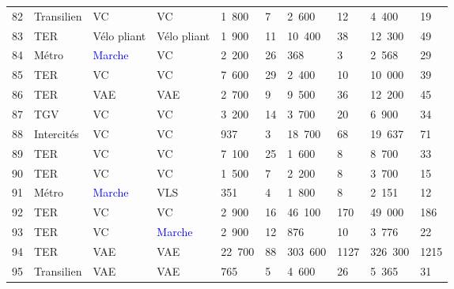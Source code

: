 \begin{longtable}{p{0.7cm}p{1.4cm}p{1.4cm}p{1.6cm}p{0.8cm}p{0.8cm}p{0.8cm}p{0.8cm}p{1.1cm}p{1.1cm}}
    \small{82} & \small{Transilien} & \small{VC} & \small{VC} & \small{1~800} & \small{7} & \small{2~600} & \small{12} & \small{4~400} & \small{19} \\
    \small{83} & \small{TER} & \small{Vélo pliant} & \small{Vélo pliant} & \small{1~900} & \small{11} & \small{10~400} & \small{38} & \small{12~300} & \small{49} \\
    \small{84} & \small{Métro} & \small{\textcolor{blue}{Marche}} & \small{VC} & \small{2~200} & \small{26} & \small{368} & \small{3} & \small{2~568} & \small{29} \\
    \small{85} & \small{TER} & \small{VC} & \small{VC} & \small{7~600} & \small{29} & \small{2~400} & \small{10} & \small{10~000} & \small{39} \\
    \small{86} & \small{TER} & \small{VAE} & \small{VAE} & \small{2~700} & \small{9} & \small{9~500} & \small{36} & \small{12~200} & \small{45} \\
    \small{87} & \small{TGV} & \small{VC} & \small{VC} & \small{3~200} & \small{14} & \small{3~700} & \small{20} & \small{6~900} & \small{34} \\
    \small{88} & \small{Intercités} & \small{VC} & \small{VC} & \small{937} & \small{3} & \small{18~700} & \small{68} & \small{19~637} & \small{71} \\
    \small{89} & \small{TER} & \small{VC} & \small{VC} & \small{7~100} & \small{25} & \small{1~600} & \small{8} & \small{8~700} & \small{33} \\
    \small{90} & \small{TER} & \small{VC} & \small{VC} & \small{1~500} & \small{7} & \small{2~200} & \small{8} & \small{3~700} & \small{15} \\
    \small{91} & \small{Métro} & \small{\textcolor{blue}{Marche}} & \small{VLS} & \small{351} & \small{4} & \small{1~800} & \small{8} & \small{2~151} & \small{12} \\
    \small{92} & \small{TER} & \small{VC} & \small{VC} & \small{2~900} & \small{16} & \small{46~100} & \small{170} & \small{49~000} & \small{186} \\
    \small{93} & \small{TER} & \small{VC} & \small{\textcolor{blue}{Marche}} & \small{2~900} & \small{12} & \small{876} & \small{10} & \small{3~776} & \small{22} \\
    \small{94} & \small{TER} & \small{VAE} & \small{VAE} & \small{22~700} & \small{88} & \small{303~600} & \small{1127} & \small{326~300} & \small{1215} \\
    \small{95} & \small{Transilien} & \small{VAE} & \small{VAE} & \small{765} & \small{5} & \small{4~600} & \small{26} & \small{5~365} & \small{31} \\

\end{longtable}
